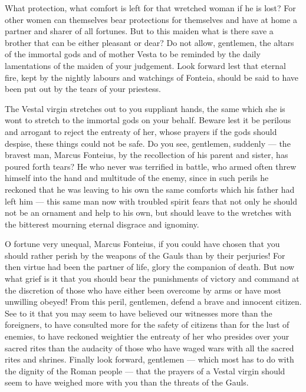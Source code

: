  What protection, what comfort is left for that wretched woman if he is lost? For other women can themselves bear protections for themselves and have at home a partner and sharer of all fortunes. But to this maiden what is there save a brother that can be either pleasant or dear? Do not allow, gentlemen, the altars of the immortal gods and of mother Vesta to be reminded by the daily lamentations of the maiden of your judgement. Look forward lest that eternal fire, kept by the nightly labours and watchings of Fonteia, should be said to have been put out by the tears of your priestess.

 The Vestal virgin stretches out to you suppliant hands, the same which she is wont to stretch to the immortal gods on your behalf. Beware lest it be perilous and arrogant to reject the entreaty of her, whose prayers if the gods should despise, these things could not be safe. Do you see, gentlemen, suddenly --- the bravest man, Marcus Fonteius, by the recollection of his parent and sister, has poured forth tears? He who never was terrified in battle, who armed often threw himself into the hand and multitude of the enemy, since in such perils he reckoned that he was leaving to his own the same comforts which his father had left him --- this same man now with troubled spirit fears that not only he should not be an ornament and help to his own, but should leave to the wretches with the bitterest mourning eternal disgrace and ignominy.

 O fortune very unequal, Marcus Fonteius, if you could have chosen that you should rather perish by the weapons of the Gauls than by their perjuries! For then virtue had been the partner of life, glory the companion of death. But now what grief is it that you should bear the punishments of victory and command at the discretion of those who have either been overcome by arms or have most unwilling obeyed! From this peril, gentlemen, defend a brave and innocent citizen. See to it that you may seem to have believed our witnesses more than the foreigners, to have consulted more for the safety of citizens than for the lust of enemies, to have reckoned weightier the entreaty of her who presides over your sacred rites than the audacity of those who have waged wars with all the sacred rites and shrines. Finally look forward, gentlemen --- which most has to do with the dignity of the Roman people --- that the prayers of a Vestal virgin should seem to have weighed more with you than the threats of the Gauls.

